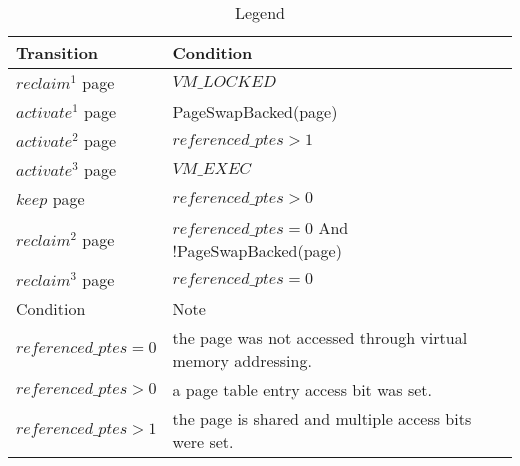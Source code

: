 \documentclass{article}
\begin{document}
\begin{table}
\begin{tabular}{|l|l|}
\hline
Transition & Condition \\
\hline
$reclaim^1$  page & $VM\_LOCKED$                                     \\
$activate^1$ page & PageSwapBacked(page)                             \\
$activate^2$ page & $referenced\_ptes > 1$                           \\
$activate^3$ page & $VM\_EXEC$                                       \\
$keep$       page & $referenced\_ptes > 0$                           \\
$reclaim^2$  page & $referenced\_ptes = 0$ And !PageSwapBacked(page) \\
$reclaim^3$  page & $referenced\_ptes = 0$                           \\
\hline
Condition               & Note \\
\hline
$referenced\_ptes = 0$ & the page was not accessed through virtual memory addressing. \\
$referenced\_ptes > 0$ & a page table entry access bit was set. \\
$referenced\_ptes > 1$ & the page is shared and multiple access bits were set. \\
\hline

\end{tabular}
\caption{Legend}
\end{table}
\end{document}
